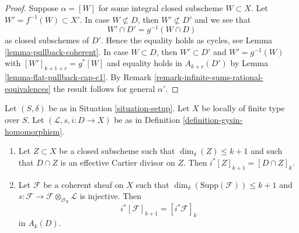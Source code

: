 \begin{proof}
Suppose $\alpha = [W]$ for some integral closed subscheme
$W \subset X$. Let $W' = f^{-1}(W) \subset X'$. In case $W \not \subset D$,
then $W' \not \subset D'$ and we see that
$$
W' \cap D' = g^{-1}(W \cap D)
$$
as closed subschemes of $D'$. Hence the
equality holds as cycles, see Lemma \ref{lemma-pullback-coherent}.
In case $W \subset D$, then $W' \subset D'$ and $W' = g^{-1}(W)$
with $[W']_{k + 1 + r} = g^*[W]$ and equality holds in
$A_{k + r}(D')$ by Lemma \ref{lemma-flat-pullback-cap-c1}.
By Remark \ref{remark-infinite-sums-rational-equivalences}
the result follows for general $\alpha'$.
\end{proof}

\begin{lemma}
\label{lemma-easy-gysin}
Let $(S, \delta)$ be as in Situation \ref{situation-setup}.
Let $X$ be locally of finite type over $S$.
Let $(\mathcal{L}, s, i : D \to X)$ be as in
Definition \ref{definition-gysin-homomorphism}.
\begin{enumerate}
\item Let $Z \subset X$ be a closed subscheme such
that $\dim_\delta(Z) \leq k + 1$ and such that
$D \cap Z$ is an effective Cartier divisor on $Z$. Then
$i^*[Z]_{k + 1} = [D \cap Z]_k$.
\item Let $\mathcal{F}$ be a coherent sheaf on $X$
such that $\dim_\delta(\text{Supp}(\mathcal{F})) \leq k + 1$ and
$s : \mathcal{F} \to \mathcal{F} \otimes_{\mathcal{O}_X} \mathcal{L}$
is injective. Then
$$
i^*[\mathcal{F}]_{k + 1} = [i^*\mathcal{F}]_k
$$
in $A_k(D)$.
\end{enumerate}
\end{lemma}

